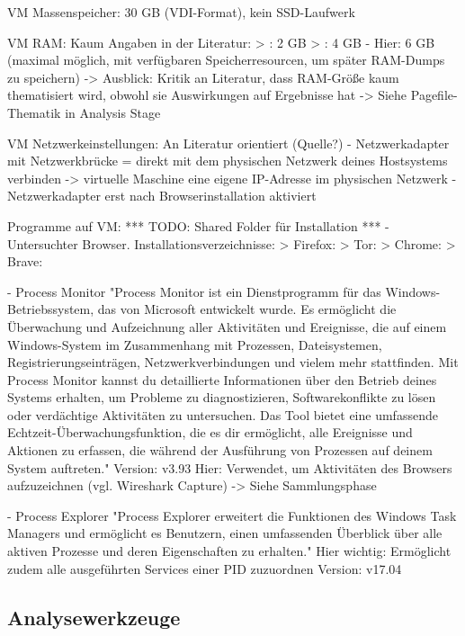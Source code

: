 VM Massenspeicher: 30 GB (VDI-Format), kein SSD-Laufwerk

VM RAM: Kaum Angaben in der Literatur:
	> \cite{Rochmadi.2017}: 2 GB 
	> \cite{Ohana.2013}: 4 GB
	- Hier: 6 GB (maximal möglich, mit verfügbaren Speicherresourcen, um später RAM-Dumps zu speichern)
	-> Ausblick: Kritik an Literatur, dass RAM-Größe kaum thematisiert wird, obwohl sie Auswirkungen auf Ergebnisse hat -> Siehe Pagefile-Thematik in Analysis Stage

VM Netzwerkeinstellungen: An Literatur orientiert (Quelle?)
	- Netzwerkadapter mit Netzwerkbrücke = direkt mit dem physischen Netzwerk deines Hostsystems verbinden -> virtuelle Maschine eine eigene IP-Adresse im physischen Netzwerk
	- Netzwerkadapter erst nach Browserinstallation aktiviert

Programme auf VM:
*** TODO: Shared Folder für Installation ***
	- Untersuchter Browser. Installationsverzeichnisse:
		> Firefox: %
		> Tor: %
		> Chrome:
		> Brave:
			
	- Process Monitor
		"Process Monitor ist ein Dienstprogramm für das Windows-Betriebssystem, das von Microsoft entwickelt wurde. Es ermöglicht die Überwachung und Aufzeichnung aller Aktivitäten und Ereignisse, die auf einem Windows-System im Zusammenhang mit Prozessen, Dateisystemen, Registrierungseinträgen, Netzwerkverbindungen und vielem mehr stattfinden. Mit Process Monitor kannst du detaillierte Informationen über den Betrieb deines Systems erhalten, um Probleme zu diagnostizieren, Softwarekonflikte zu lösen oder verdächtige Aktivitäten zu untersuchen. Das Tool bietet eine umfassende Echtzeit-Überwachungsfunktion, die es dir ermöglicht, alle Ereignisse und Aktionen zu erfassen, die während der Ausführung von Prozessen auf deinem System auftreten."
		Version: v3.93
		Hier: Verwendet, um Aktivitäten des Browsers aufzuzeichnen (vgl. Wireshark Capture) -> Siehe Sammlungsphase
	
	- Process Explorer
		"Process Explorer erweitert die Funktionen des Windows Task Managers und ermöglicht es Benutzern, einen umfassenden Überblick über alle aktiven Prozesse und deren Eigenschaften zu erhalten." 
		Hier wichtig: Ermöglicht zudem alle ausgeführten Services einer PID zuzuordnen
		Version: v17.04

\subsection{Analysewerkzeuge}


